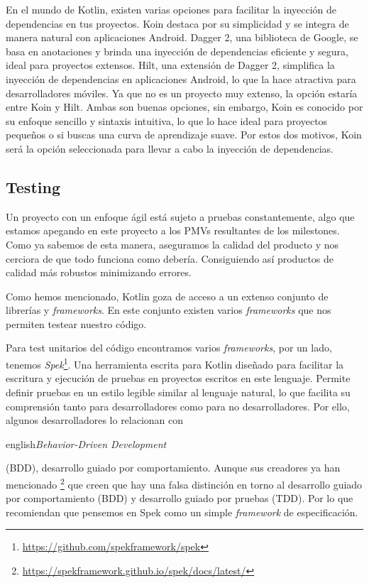 En el mundo de Kotlin, existen varias opciones para facilitar la inyección de dependencias en tus 
proyectos. Koin destaca por su simplicidad y se integra de manera natural con aplicaciones Android. 
Dagger 2, una biblioteca de Google, se basa en anotaciones y brinda una inyección de dependencias 
eficiente y segura, ideal para proyectos extensos. Hilt, una extensión de Dagger 2, simplifica la 
inyección de dependencias en aplicaciones Android, lo que la hace atractiva para desarrolladores 
móviles. Ya que no es un proyecto muy extenso, la opción estaría entre Koin y Hilt. Ambas son buenas 
opciones, sin embargo, Koin es conocido por su enfoque sencillo y sintaxis intuitiva, lo que lo hace 
ideal para proyectos pequeños o si buscas una curva de aprendizaje suave. Por estos dos motivos, Koin 
será la opción seleccionada para llevar a cabo la inyección de dependencias.

\subsection{Testing}

Un proyecto con un enfoque ágil está sujeto a pruebas constantemente, algo que estamos apegando en este 
proyecto a los PMVs resultantes de los milestones. Como ya sabemos de esta manera, aseguramos la 
calidad del producto y nos cerciora de que todo funciona como debería. Consiguiendo así productos de 
calidad más robustos minimizando errores.

Como hemos mencionado, Kotlin goza de acceso a un extenso conjunto de librerías y \textit{frameworks}. 
En este conjunto existen varios \textit{frameworks} que nos permiten testear nuestro código.

Para test unitarios del código encontramos varios \textit{frameworks}, por un lado, tenemos 
\textit{Spek}\footnote{\url{https://github.com/spekframework/spek}}. Una herramienta escrita para 
Kotlin diseñado para facilitar la escritura y ejecución de pruebas en proyectos escritos en este 
lenguaje. Permite definir pruebas en un estilo legible similar al lenguaje natural, lo que facilita 
su comprensión tanto para desarrolladores como para no desarrolladores. Por ello, algunos 
desarrolladores lo relacionan con \begin{otherlanguage}
{english}\textit{Behavior-Driven Development}\end{otherlanguage} (BDD), desarrollo guiado por 
comportamiento. Aunque sus creadores ya han mencionado 
\footnote{\url{https://spekframework.github.io/spek/docs/latest/}} que creen que hay una falsa 
distinción en torno al desarrollo guiado por comportamiento (BDD) y desarrollo guiado por pruebas 
(TDD). Por lo que recomiendan que pensemos en Spek como un simple \textit{framework} de 
especificación.

